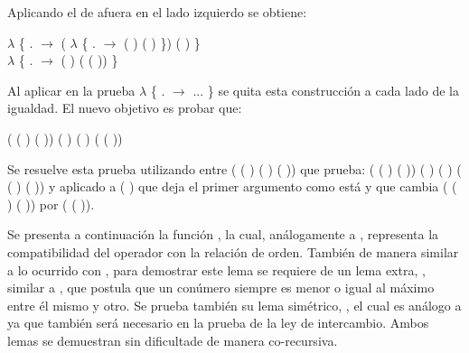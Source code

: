 Aplicando el  de afuera en el lado izquierdo se obtiene:
\begin{center} 
\AgdaFunction{[}  \AgdaFunction{]}  $\lambda$ \{ . $\rightarrow$   ( $\lambda$ \{ . $\rightarrow$   ( ) (  ) \}) ( ) \} \AgdaFunction{$\sim$}
\\
 $\lambda$ \{ . $\rightarrow$  ( ) ( ( )) \}
\end{center}
Al aplicar en la prueba  $\lambda$ \{ . $\rightarrow$ ... \} se quita esta construcción a cada lado de la igualdad. El nuevo objetivo es probar que:
\begin{center} 
\AgdaFunction{[}  \AgdaFunction{]}   ( ( ) (  ))  ( ) \AgdaFunction{$\sim$}  ( ) ( ( ))
\end{center}
Se resuelve esta prueba utilizando  entre ( ( ) ( ) ( )) que prueba: 
\AgdaFunction{[}  \AgdaFunction{]}   ( ( ) (  ))  ( ) \AgdaFunction{$\sim$}  ( ) ( ( ) ( )) y  aplicado a  ( ) que deja el primer argumento como está y  que cambia ( ( ) ( )) por ( ( )).

Se presenta a continuación la función , la cual, análogamente a , representa la compatibilidad del operador  con la relación de orden. También de manera similar a lo ocurrido con , para demostrar este lema se requiere de un lema extra, , similar a , que postula que un conúmero siempre es menor o igual al máximo entre él mismo y otro. Se prueba también su lema simétrico, , el cual es análogo a  ya que también será necesario en la prueba de la ley de intercambio. Ambos lemas se demuestran sin dificultade de manera co-recursiva.

